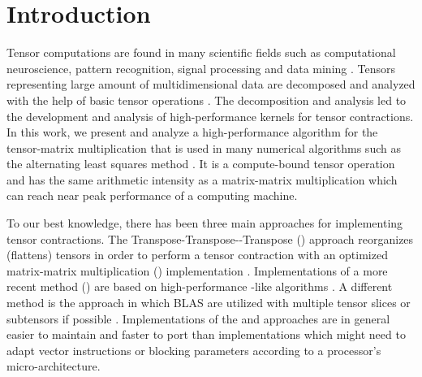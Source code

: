 \section{Introduction}
\label{sec:introduction}
Tensor computations are found in many scientific fields such as computational neuroscience, pattern recognition, signal processing and data mining \cite{karahan:2015:tensor, papalexakis:2017:tensors}.
Tensors representing large amount of multidimensional data are decomposed and analyzed with the help of basic tensor operations \cite{lee:2018:fundamental, kolda:2009:decompositions}. 
The decomposition and analysis led to the development and analysis of high-performance kernels for tensor contractions.
In this work, we present and analyze a high-performance algorithm for the tensor-matrix multiplication that is used in many numerical algorithms such as the alternating least squares method \cite{lee:2018:fundamental, kolda:2009:decompositions}.
It is a compute-bound tensor operation and has the same arithmetic intensity as a matrix-matrix multiplication which can reach near peak performance of a computing machine. 

To our best knowledge, there has been three main approaches for implementing tensor contractions.
The Transpose-Transpose--Transpose () approach reorganizes (flattens) tensors in order to perform a tensor contraction with an optimized matrix-matrix multiplication () implementation \cite{bader:2006:algorithm862, solomonik:2013:cyclops}.
Implementations of a more recent method () are based on high-performance -like algorithms \cite{springer:2018:design, matthews:2018:high, abadi:2016:tensorflow}.
A different method is the  approach in which BLAS are utilized with multiple tensor slices or subtensors if possible \cite{dinapoli:2014:towards.efficient.use, li:2015:input, shi:2016:tensor.contraction}.
Implementations of the  and  approaches are in general easier to maintain and faster to port than  implementations which might need to adapt vector instructions or blocking parameters according to a processor's micro-architecture.

